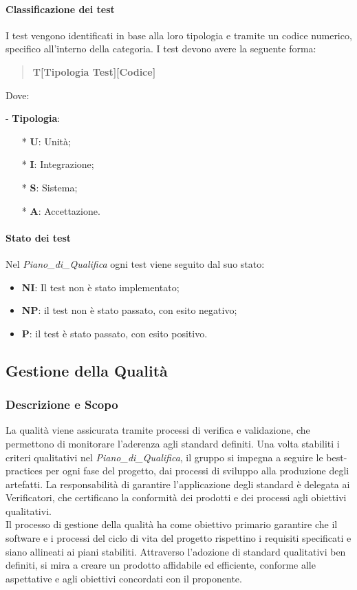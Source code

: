 \documentclass[10pt]{article}
\begin{document}
\begin{justify}
    \paragraph{Classificazione dei test}
    I test vengono identificati in base alla loro tipologia e tramite un codice numerico, specifico all'interno della categoria. I test devono avere la seguente forma:
    \begin{quote}
    \textbf{T[Tipologia Test][Codice]}\\
    \end{quote}
    Dove:
    \item [-] \textbf{Tipologia}:
    \begin{itemize}
        \item [*] \textbf{U}: Unità;
        \item [*] \textbf{I}: Integrazione;
        \item [*] \textbf{S}: Sistema;
        \item [*] \textbf{A}: Accettazione.
    \end{itemize}

    \paragraph{Stato dei test}
    Nel \textit{Piano\_di\_Qualifica} ogni test viene seguito dal suo stato:
    \begin{itemize}
    \item \textbf{NI}: Il test non è stato implementato;
    \item \textbf{NP}: il test non è stato passato, con esito negativo;
    \item \textbf{P}: il test è stato passato, con esito positivo.
    \end{itemize}

\subsection{Gestione della Qualità}

    \subsubsection{Descrizione e Scopo}
     La qualità viene assicurata tramite processi di verifica e validazione, che permettono di monitorare l'aderenza agli standard definiti. Una volta stabiliti i criteri qualitativi nel \textit{Piano\_di\_Qualifica}, il gruppo si impegna a seguire le best-practices per ogni fase del progetto, dai processi di sviluppo alla produzione degli artefatti. La responsabilità di garantire l'applicazione degli standard è delegata ai Verificatori, che certificano la conformità dei prodotti e dei processi agli obiettivi qualitativi.\\
     Il processo di gestione della qualità ha come obiettivo primario garantire che il software e i processi del ciclo di vita del progetto rispettino i requisiti specificati e siano allineati ai piani stabiliti. Attraverso l'adozione di standard qualitativi ben definiti, si mira a creare un prodotto affidabile ed efficiente, conforme alle aspettative e agli obiettivi concordati con il proponente.
    

\end{justify}
\end{document}
